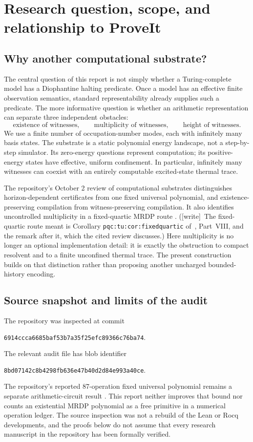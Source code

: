 \documentclass[11pt,letterpaper]{article}
\theoremstyle{definition}
\theoremstyle{remark}
\newcommand{\wtag}{\textup{[write]}}
\begin{document}
\section{Research question, scope, and relationship to ProveIt}\label{ste:ta:sec:intro}
\subsection{Why another computational substrate?}
The central question of this report is not simply whether a Turing-complete model has a Diophantine halting predicate. Once a model has an effective finite observation semantics, standard representability already supplies such a predicate. The more informative question is whether an arithmetic representation can separate three independent obstacles:
\[
\text{existence of witnesses},\qquad
\text{multiplicity of witnesses},\qquad
\text{height of witnesses}.
\]
We use a finite number of occupation-number modes, each with infinitely many basis states. The substrate is a static polynomial energy landscape, not a step-by-step simulator. Its zero-energy questions represent computation; its positive-energy states have effective, uniform confinement. In particular, infinitely many witnesses can coexist with an entirely computable excited-state thermal trace.

The repository's October 2 review of computational substrates distinguishes horizon-dependent certificates from one fixed universal polynomial, and existence-preserving compilation from witness-preserving compilation. It also identifies uncontrolled multiplicity in a fixed-quartic MRDP route \cite{repoReview}. (\wtag\ The fixed-quartic route meant is Corollary \texttt{pqc:tu:cor:fixedquartic} of~\cite{pqc}, Part~VIII, and the remark after it, which the cited review discusses.) Here multiplicity is no longer an optional implementation detail: it is exactly the obstruction to compact resolvent and to a finite unconfined thermal trace. The present construction builds on that distinction rather than proposing another uncharged bounded-history encoding.

\subsection{Source snapshot and limits of the audit}
The repository was inspected at commit
\begin{center}
\texttt{6914ccca6685baf53b7a35f25efc89366c76ba74}.
\end{center}
The relevant audit file has blob identifier
\begin{center}
\texttt{8bd07142c8b4298fb636e47b40d2d84e993a40ce}.
\end{center}
The repository's reported 87-operation fixed universal polynomial remains a separate arithmetic-circuit result \cite{repoH10}. This report neither improves that bound nor counts an existential MRDP polynomial as a free primitive in a numerical operation ledger. The source inspection was not a rebuild of the Lean or Rocq developments, and the proofs below do not assume that every research manuscript in the repository has been formally verified.
\end{document}
